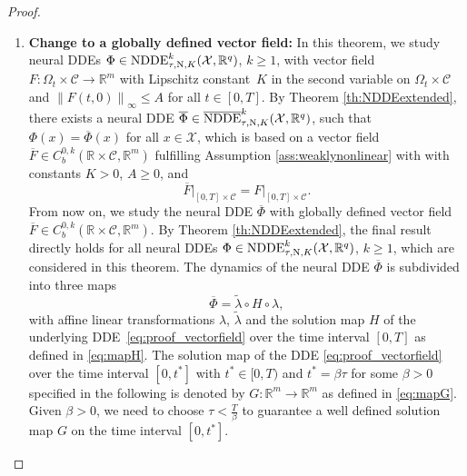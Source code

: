 \documentclass[10pt]{article}
\numberwithin{equation}{section}
\newcommand\norm[1]{\left\lVert#1\right\rVert}
\begin{document}
\begin{proof}
\begin{enumerate}
			\item \textbf{Change to a globally defined vector field:} In this theorem, we study neural DDEs  $\Phi \in \textup{NDDE}_{\tau,\textup{N},K}^k(\mathcal{X},\mathbb{R}^q)$, $k \geq 1$, with vector field $F:\Omega_t \times \mathcal{C} \rightarrow \mathbb{R}^m$ with Lipschitz constant~$K$ in the second variable on $\Omega_t \times \mathcal{C}$ and $\norm{F(t,0)}_\infty \leq A$ for all $t\in [0,T]$. By Theorem \ref{th:NDDEextended}, there exists a neural DDE $\overline{\Phi}\in \overline{\textup{NDDE}}_{\tau,\textup{N},K}^k(\mathcal{X},\mathbb{R}^q)$, such that  $\Phi(x) = \overline{\Phi}(x)$ for all $x \in \mathcal{X}$, which is based on a vector field $\overline{F}\in C_b^{0,k}(\mathbb{R}\times \mathcal{C},\mathbb{R}^m)$ fulfilling Assumption \ref{ass:weaklynonlinear} with with constants $K>0$, $A\geq 0$, and $$\overline{F}\big\vert_{[0,T]\times \mathcal{C}}= F\big\vert_{[0,T]\times \mathcal{C}}.$$
			From now on, we study the neural DDE $\overline{\Phi}$ with globally defined vector field $\overline{F}\in C_b^{0,k}(\mathbb{R}\times \mathcal{C},\mathbb{R}^m)$. By Theorem \ref{th:NDDEextended}, the final result directly holds for all neural DDEs  $\Phi \in \textup{NDDE}_{\tau,\textup{N},K}^k(\mathcal{X},\mathbb{R}^q)$, $k \geq 1$, which are considered in this theorem. The dynamics of the neural DDE $\overline \Phi$ is subdivided into three maps
			\begin{equation*}
				\overline\Phi = \tilde\lambda \circ H  \circ \lambda,
			\end{equation*}
			with affine linear transformations $\lambda$, $\tilde \lambda$ and the solution map $H$  of the underlying DDE~\eqref{eq:proof_vectorfield} over the time interval $[0,T]$ as defined in  \eqref{eq:mapH}. The solution map of the DDE \eqref{eq:proof_vectorfield} over the time interval $[0,t^\ast]$ with $t^\ast \in [0,T)$ and $t^\ast = \beta \tau$ for some $\beta>0$ specified in the following is denoted by $G:\mathbb{R}^m\rightarrow \mathbb{R}^m$ as defined in \eqref{eq:mapG}. Given $\beta>0$, we need to choose $\tau<\frac{T}{\beta}$ to guarantee a well defined solution map $G$ on the time interval $[0,t^\ast]$.

\end{enumerate}
\end{proof}
\end{document}
